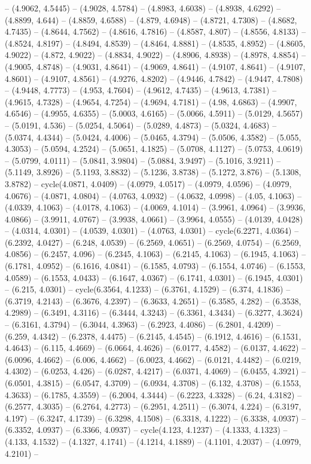 -- (4.9062, 4.5445) -- (4.9028, 4.5784) -- (4.8983, 4.6038) -- (4.8938, 4.6292) -- (4.8899, 4.644) -- (4.8859, 4.6588) -- (4.879, 4.6948) -- (4.8721, 4.7308) -- (4.8682, 4.7435) -- (4.8644, 4.7562) -- (4.8616, 4.7816) -- (4.8587, 4.807) -- (4.8556, 4.8133) -- (4.8524, 4.8197) -- (4.8494, 4.8539) -- (4.8464, 4.8881) -- (4.8535, 4.8952) -- (4.8605, 4.9022) -- (4.872, 4.9022) -- (4.8834, 4.9022) -- (4.8906, 4.8938) -- (4.8978, 4.8854) -- (4.9005, 4.8748) -- (4.9031, 4.8641) -- (4.9069, 4.8641) -- (4.9107, 4.8641) -- (4.9107, 4.8601) -- (4.9107, 4.8561) -- (4.9276, 4.8202) -- (4.9446, 4.7842) -- (4.9447, 4.7808) -- (4.9448, 4.7773) -- (4.953, 4.7604) -- (4.9612, 4.7435) -- (4.9613, 4.7381) -- (4.9615, 4.7328) -- (4.9654, 4.7254) -- (4.9694, 4.7181) -- (4.98, 4.6863) -- (4.9907, 4.6546) -- (4.9955, 4.6355) -- (5.0003, 4.6165) -- (5.0066, 4.5911) -- (5.0129, 4.5657) -- (5.0191, 4.536) -- (5.0254, 4.5064) -- (5.0289, 4.4873) -- (5.0324, 4.4683) -- (5.0374, 4.4344) -- (5.0424, 4.4006) -- (5.0465, 4.3794) -- (5.0506, 4.3582) -- (5.055, 4.3053) -- (5.0594, 4.2524) -- (5.0651, 4.1825) -- (5.0708, 4.1127) -- (5.0753, 4.0619) -- (5.0799, 4.0111) -- (5.0841, 3.9804) -- (5.0884, 3.9497) -- (5.1016, 3.9211) -- (5.1149, 3.8926) -- (5.1193, 3.8832) -- (5.1236, 3.8738) -- (5.1272, 3.876) -- (5.1308, 3.8782) -- cycle(4.0871, 4.0409) -- (4.0979, 4.0517) -- (4.0979, 4.0596) -- (4.0979, 4.0676) -- (4.0871, 4.0804) -- (4.0763, 4.0932) -- (4.0632, 4.0998) -- (4.05, 4.1063) -- (4.0339, 4.1063) -- (4.0178, 4.1063) -- (4.0069, 4.1014) -- (3.9961, 4.0964) -- (3.9936, 4.0866) -- (3.9911, 4.0767) -- (3.9938, 4.0661) -- (3.9964, 4.0555) -- (4.0139, 4.0428) -- (4.0314, 4.0301) -- (4.0539, 4.0301) -- (4.0763, 4.0301) -- cycle(6.2271, 4.0364) -- (6.2392, 4.0427) -- (6.248, 4.0539) -- (6.2569, 4.0651) -- (6.2569, 4.0754) -- (6.2569, 4.0856) -- (6.2457, 4.096) -- (6.2345, 4.1063) -- (6.2145, 4.1063) -- (6.1945, 4.1063) -- (6.1781, 4.0952) -- (6.1616, 4.0841) -- (6.1585, 4.0793) -- (6.1554, 4.0746) -- (6.1553, 4.0589) -- (6.1553, 4.0433) -- (6.1647, 4.0367) -- (6.1741, 4.0301) -- (6.1945, 4.0301) -- (6.215, 4.0301) -- cycle(6.3564, 4.1233) -- (6.3761, 4.1529) -- (6.374, 4.1836) -- (6.3719, 4.2143) -- (6.3676, 4.2397) -- (6.3633, 4.2651) -- (6.3585, 4.282) -- (6.3538, 4.2989) -- (6.3491, 4.3116) -- (6.3444, 4.3243) -- (6.3361, 4.3434) -- (6.3277, 4.3624) -- (6.3161, 4.3794) -- (6.3044, 4.3963) -- (6.2923, 4.4086) -- (6.2801, 4.4209) -- (6.259, 4.4342) -- (6.2378, 4.4475) -- (6.2145, 4.4545) -- (6.1912, 4.4616) -- (6.1531, 4.4643) -- (6.115, 4.4669) -- (6.0664, 4.4626) -- (6.0177, 4.4582) -- (6.0137, 4.4622) -- (6.0096, 4.4662) -- (6.006, 4.4662) -- (6.0023, 4.4662) -- (6.0121, 4.4482) -- (6.0219, 4.4302) -- (6.0253, 4.426) -- (6.0287, 4.4217) -- (6.0371, 4.4069) -- (6.0455, 4.3921) -- (6.0501, 4.3815) -- (6.0547, 4.3709) -- (6.0934, 4.3708) -- (6.132, 4.3708) -- (6.1553, 4.3633) -- (6.1785, 4.3559) -- (6.2004, 4.3444) -- (6.2223, 4.3328) -- (6.24, 4.3182) -- (6.2577, 4.3035) -- (6.2764, 4.2773) -- (6.2951, 4.2511) -- (6.3074, 4.224) -- (6.3197, 4.197) -- (6.3247, 4.1739) -- (6.3298, 4.1508) -- (6.3318, 4.1222) -- (6.3338, 4.0937) -- (6.3352, 4.0937) -- (6.3366, 4.0937) -- cycle(4.123, 4.1237) -- (4.1333, 4.1323) -- (4.133, 4.1532) -- (4.1327, 4.1741) -- (4.1214, 4.1889) -- (4.1101, 4.2037) -- (4.0979, 4.2101) -- 